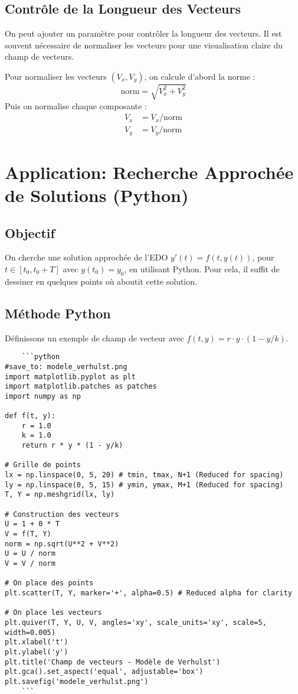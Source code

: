 \documentclass[oneside]{book}
\begin{document}
\subsection{Contrôle de la Longueur des Vecteurs}

On peut ajouter un paramètre pour contrôler la longueur des vecteurs.  Il est souvent nécessaire de normaliser les vecteurs pour une visualisation claire du champ de vecteurs.

Pour normaliser les vecteurs $(V_x, V_y)$, on calcule d'abord la norme :
\begin{equation}
\text{norm} = \sqrt{V_x^2 + V_y^2}
\end{equation}
Puis on normalise chaque composante :
\begin{align*}
V_x &= V_x / \text{norm} \\
V_y &= V_y / \text{norm}
\end{align*}

\section{Application: Recherche Approchée de Solutions (Python)}

\subsection{Objectif}

On cherche une solution approchée de l'EDO $y'(t) = f(t, y(t))$, pour $t \in [t_0, t_0 + T]$ avec $y(t_0) = y_0$, en utilisant Python. Pour cela, il suffit de dessiner en quelques points où aboutit cette solution.

\subsection{Méthode Python}

Définissons un exemple de champ de vecteur avec $f(t, y) = r \cdot y \cdot (1 - y/k)$.

\begin{verbatim}
    ```python
#save_to: modele_verhulst.png
import matplotlib.pyplot as plt
import matplotlib.patches as patches
import numpy as np

def f(t, y):
    r = 1.0
    k = 1.0
    return r * y * (1 - y/k)

# Grille de points
lx = np.linspace(0, 5, 20) # tmin, tmax, N+1 (Reduced for spacing)
ly = np.linspace(0, 5, 15) # ymin, ymax, M+1 (Reduced for spacing)
T, Y = np.meshgrid(lx, ly)

# Construction des vecteurs
U = 1 + 0 * T
V = f(T, Y)
norm = np.sqrt(U**2 + V**2)
U = U / norm
V = V / norm

# On place des points
plt.scatter(T, Y, marker='+', alpha=0.5) # Reduced alpha for clarity

# On place les vecteurs
plt.quiver(T, Y, U, V, angles='xy', scale_units='xy', scale=5, width=0.005)
plt.xlabel('t')
plt.ylabel('y')
plt.title('Champ de vecteurs - Modèle de Verhulst')
plt.gca().set_aspect('equal', adjustable='box')
plt.savefig('modele_verhulst.png')
    ```
\end{verbatim}
\end{document}
